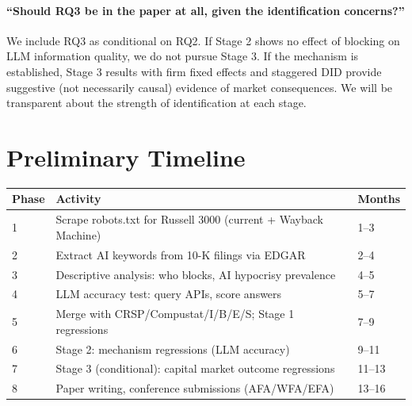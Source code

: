 \documentclass[12pt,a4paper]{article}
\begin{document}
\paragraph{``Should RQ3 be in the paper at all, given the identification concerns?''} We include RQ3 as conditional on RQ2. If Stage 2 shows no effect of blocking on LLM information quality, we do not pursue Stage 3. If the mechanism is established, Stage 3 results with firm fixed effects and staggered DID provide suggestive (not necessarily causal) evidence of market consequences. We will be transparent about the strength of identification at each stage.

\section{Preliminary Timeline}

\begin{table}[htbp]
\centering
\begin{tabular}{lll}
\toprule
\textbf{Phase} & \textbf{Activity} & \textbf{Months} \\
\midrule
1 & Scrape robots.txt for Russell 3000 (current + Wayback Machine) & 1--3 \\
2 & Extract AI keywords from 10-K filings via EDGAR & 2--4 \\
3 & Descriptive analysis: who blocks, AI hypocrisy prevalence & 4--5 \\
4 & LLM accuracy test: query APIs, score answers & 5--7 \\
5 & Merge with CRSP/Compustat/I/B/E/S; Stage 1 regressions & 7--9 \\
6 & Stage 2: mechanism regressions (LLM accuracy) & 9--11 \\
7 & Stage 3 (conditional): capital market outcome regressions & 11--13 \\
8 & Paper writing, conference submissions (AFA/WFA/EFA) & 13--16 \\
\bottomrule
\end{tabular}
\end{table}

\end{document}

